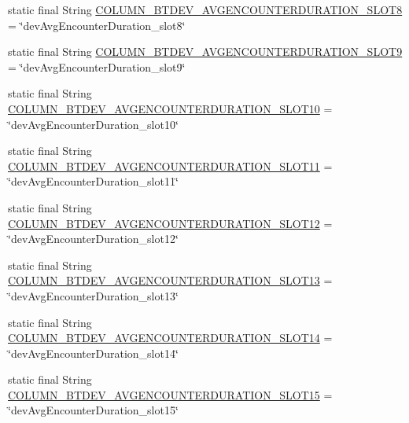 \begin{DoxyCompactItemize}
\item 
static final String \hyperlink{classcs_1_1usense_1_1db_1_1_usense_s_q_lite_helper_ae6d896f593ebdce22d22ace021dc3a05}{C\+O\+L\+U\+M\+N\+\_\+\+B\+T\+D\+E\+V\+\_\+\+A\+V\+G\+E\+N\+C\+O\+U\+N\+T\+E\+R\+D\+U\+R\+A\+T\+I\+O\+N\+\_\+\+S\+L\+O\+T8} = \char`\"{}dev\+Avg\+Encounter\+Duration\+\_\+slot8\char`\"{}
\item 
static final String \hyperlink{classcs_1_1usense_1_1db_1_1_usense_s_q_lite_helper_aba3e1c471fa73dda5a9ff1dbb2a989db}{C\+O\+L\+U\+M\+N\+\_\+\+B\+T\+D\+E\+V\+\_\+\+A\+V\+G\+E\+N\+C\+O\+U\+N\+T\+E\+R\+D\+U\+R\+A\+T\+I\+O\+N\+\_\+\+S\+L\+O\+T9} = \char`\"{}dev\+Avg\+Encounter\+Duration\+\_\+slot9\char`\"{}
\item 
static final String \hyperlink{classcs_1_1usense_1_1db_1_1_usense_s_q_lite_helper_a61d8bcbbafbf9b14a772fb3633d07964}{C\+O\+L\+U\+M\+N\+\_\+\+B\+T\+D\+E\+V\+\_\+\+A\+V\+G\+E\+N\+C\+O\+U\+N\+T\+E\+R\+D\+U\+R\+A\+T\+I\+O\+N\+\_\+\+S\+L\+O\+T10} = \char`\"{}dev\+Avg\+Encounter\+Duration\+\_\+slot10\char`\"{}
\item 
static final String \hyperlink{classcs_1_1usense_1_1db_1_1_usense_s_q_lite_helper_afcbdd9c400be39e5180590d7c56f0faa}{C\+O\+L\+U\+M\+N\+\_\+\+B\+T\+D\+E\+V\+\_\+\+A\+V\+G\+E\+N\+C\+O\+U\+N\+T\+E\+R\+D\+U\+R\+A\+T\+I\+O\+N\+\_\+\+S\+L\+O\+T11} = \char`\"{}dev\+Avg\+Encounter\+Duration\+\_\+slot11\char`\"{}
\item 
static final String \hyperlink{classcs_1_1usense_1_1db_1_1_usense_s_q_lite_helper_a45933d8508439467866ba2077b3aa866}{C\+O\+L\+U\+M\+N\+\_\+\+B\+T\+D\+E\+V\+\_\+\+A\+V\+G\+E\+N\+C\+O\+U\+N\+T\+E\+R\+D\+U\+R\+A\+T\+I\+O\+N\+\_\+\+S\+L\+O\+T12} = \char`\"{}dev\+Avg\+Encounter\+Duration\+\_\+slot12\char`\"{}
\item 
static final String \hyperlink{classcs_1_1usense_1_1db_1_1_usense_s_q_lite_helper_ac1a690ff33aa0c71b1725faf15f21eba}{C\+O\+L\+U\+M\+N\+\_\+\+B\+T\+D\+E\+V\+\_\+\+A\+V\+G\+E\+N\+C\+O\+U\+N\+T\+E\+R\+D\+U\+R\+A\+T\+I\+O\+N\+\_\+\+S\+L\+O\+T13} = \char`\"{}dev\+Avg\+Encounter\+Duration\+\_\+slot13\char`\"{}
\item 
static final String \hyperlink{classcs_1_1usense_1_1db_1_1_usense_s_q_lite_helper_ad826a396fad72798fd4d0f817f9442d4}{C\+O\+L\+U\+M\+N\+\_\+\+B\+T\+D\+E\+V\+\_\+\+A\+V\+G\+E\+N\+C\+O\+U\+N\+T\+E\+R\+D\+U\+R\+A\+T\+I\+O\+N\+\_\+\+S\+L\+O\+T14} = \char`\"{}dev\+Avg\+Encounter\+Duration\+\_\+slot14\char`\"{}
\item 
static final String \hyperlink{classcs_1_1usense_1_1db_1_1_usense_s_q_lite_helper_ab91edc3b68ef1317845043e3f2f1fb63}{C\+O\+L\+U\+M\+N\+\_\+\+B\+T\+D\+E\+V\+\_\+\+A\+V\+G\+E\+N\+C\+O\+U\+N\+T\+E\+R\+D\+U\+R\+A\+T\+I\+O\+N\+\_\+\+S\+L\+O\+T15} = \char`\"{}dev\+Avg\+Encounter\+Duration\+\_\+slot15\char`\"{}

\end{DoxyCompactItemize}
